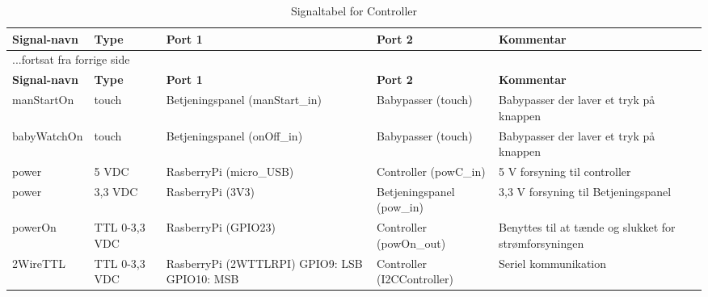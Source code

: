 \begin{center}
\label{controller:signaltabel}
\begin{longtable}{|p{}|p{}|p{}|p{}|p{3cm}|}
\caption{Signaltabel for Controller}\\
\hline
\textbf{Signal-navn}	&\textbf{Type} 		&\textbf{Port 1} 	&\textbf{Port 2} 			&\textbf{Kommentar} \\ \hline
\endfirsthead
\multicolumn{5}{l}{...fortsat fra forrige side} \\ \hline 
\textbf{Signal-navn}	&\textbf{Type} 		&\textbf{Port 1} 	&\textbf{Port 2} 			&\textbf{Kommentar} \\ \hline
\endhead


manStartOn
&touch
&Betjeningspanel \newline (manStart\_in)
&Babypasser \newline (touch)
&Babypasser der laver et tryk på knappen
\\\hline

babyWatchOn
&touch
&Betjeningspanel \newline (onOff\_in)
&Babypasser \newline (touch)
&Babypasser der laver et tryk på knappen
\\\hline

power
&5 VDC
&RasberryPi \newline(micro\_USB) 
&Controller \newline(powC\_in)
&5 V forsyning til controller
\\\hline
power
&3,3 VDC
&RasberryPi \newline(3V3) 
&Betjeningspanel \newline (pow\_in)
&3,3 V forsyning til Betjeningspanel
\\\hline


powerOn			
&TTL 0-3,3 VDC	
&RasberryPi \newline (GPIO23)				
&Controller \newline (powOn\_out) 			
&Benyttes til at tænde og slukket for strømforsyningen   				\\\hline

2WireTTL		
&TTL 0-3,3 VDC			
&RasberryPi \newline (2WTTLRPI) \newline	
	GPIO9: LSB \newline	
	GPIO10: MSB \newline	
&Controller \newline (I2CController) 			
&Seriel kommunikation
\\\hline


\end{longtable}
\end{center}
